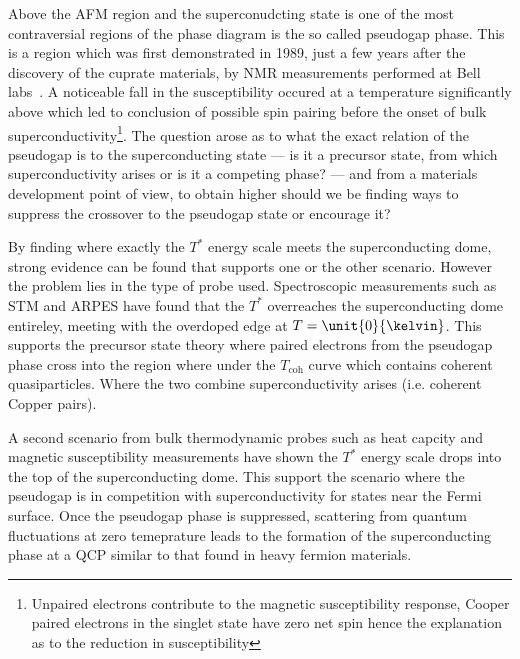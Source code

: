 Above the \ac{AFM} region and the superconudcting state is one of the most contraversial regions of the phase diagram is the so called pseudogap phase. This is a region which was first demonstrated in 1989, just a few years after the discovery of the cuprate materials, by \ac{NMR} measurements performed at Bell labs~\cite{Warren1989}. A noticeable fall in the susceptibility occured at a temperature significantly above \Tc which led to conclusion of possible spin pairing before the onset of bulk superconductivity\footnote{Unpaired electrons contribute to the magnetic susceptibility response, Cooper paired electrons in the singlet state have zero net spin hence the explanation as to the reduction in susceptibility}. The question arose as to what the exact relation of the pseudogap is to the superconducting state --- is it a precursor state, from which superconductivity arises or is it a competing phase? --- and from a materials development point of view, to obtain higher \Tc should we be finding ways to suppress the crossover to the pseudogap state or encourage it?

By finding where exactly the $T^*$ energy scale meets the superconducting dome, strong evidence can be found that supports one or the other scenario. However the problem lies in the type of probe used. Spectroscopic measurements such as \ac{STM} and \ac{ARPES} have found that the $T^*$ overreaches the superconducting dome entireley, meeting with the overdoped edge at $T=\unit{0}{\kelvin}$. This supports the precursor state theory where paired electrons from the pseudogap phase cross into the region where under the $T_{\textrm{coh}}$ curve which contains coherent quasiparticles. Where the two combine superconductivity arises (i.e. coherent Copper pairs).

A second scenario from bulk thermodynamic probes such as heat capcity and magnetic susceptibility measurements have shown the $T^*$ energy scale drops into the top of the superconducting dome. This support the scenario where the pseudogap is in competition with superconductivity for states near the Fermi surface. Once the pseudogap phase is suppressed, scattering from quantum fluctuations at zero temeprature leads to the formation of the superconducting phase at a \ac{QCP} similar to that found in heavy fermion materials.


% 

